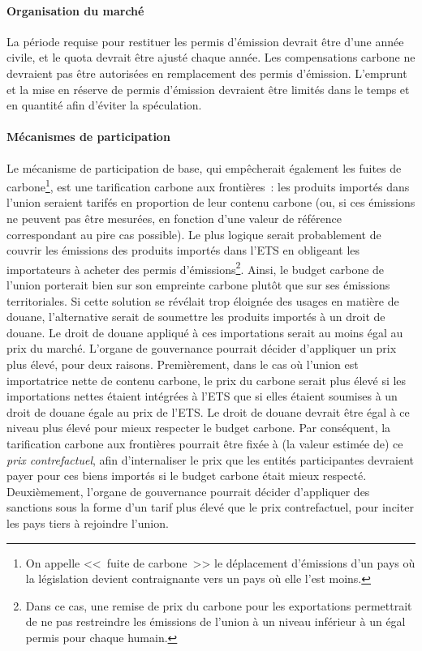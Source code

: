\documentclass[a5paper,french,openany]{memoir}
\begin{document}
\paragraph{Organisation du marché} 
La période requise pour restituer les permis d'émission devrait être d'une année civile, et le quota devrait être ajusté chaque année. Les compensations carbone ne devraient pas être autorisées en remplacement des permis d'émission. L'emprunt et la mise en réserve de permis d'émission devraient être limités dans le temps et en quantité afin d'éviter la spéculation. %

\paragraph{Mécanismes de participation}

Le mécanisme de participation de base, qui empêcherait également les fuites de carbone\footnote{On appelle <<~fuite de carbone~>> le déplacement d'émissions d'un pays où la législation devient contraignante vers un pays où elle l'est moins.}, est une tarification carbone aux frontières~: les produits importés dans l'union seraient tarifés en proportion de leur contenu carbone  (ou, si ces émissions ne peuvent pas être mesurées, en fonction d'une valeur de référence correspondant au pire cas possible). Le plus logique serait probablement de couvrir les émissions des produits importés dans l'ETS en obligeant les importateurs à acheter des permis d'émissions\footnote{Dans ce cas, une remise de prix du carbone pour les exportations permettrait de ne pas restreindre les émissions de l'union à un niveau inférieur à un égal permis pour chaque humain.}. %
Ainsi, le budget carbone de l'union porterait bien sur son empreinte carbone plutôt que sur ses émissions territoriales. Si cette solution se révélait trop éloignée des usages en matière de douane, %
l'alternative serait de soumettre les produits importés à un droit de douane. Le droit de douane appliqué à ces importations serait au moins égal au prix du marché. L'organe de gouvernance pourrait décider d'appliquer un prix plus élevé, pour deux raisons. Premièrement, dans le cas où l'union est importatrice nette de contenu carbone, le prix du carbone serait plus élevé si les importations nettes étaient intégrées à l'ETS que si elles étaient soumises à un droit de douane égale au prix de l'ETS. Le droit de douane devrait être égal à ce niveau plus élevé pour mieux respecter le budget carbone. Par conséquent, la tarification carbone aux frontières pourrait être fixée à (la valeur estimée de) ce \textit{prix contrefactuel}, afin d'internaliser le prix que les entités participantes devraient payer pour ces biens importés si le budget carbone était mieux respecté. Deuxièmement, l'organe de gouvernance pourrait décider d'appliquer des sanctions sous la forme d'un tarif plus élevé que le prix contrefactuel, pour inciter les pays tiers à rejoindre l'union. 
\end{document}
